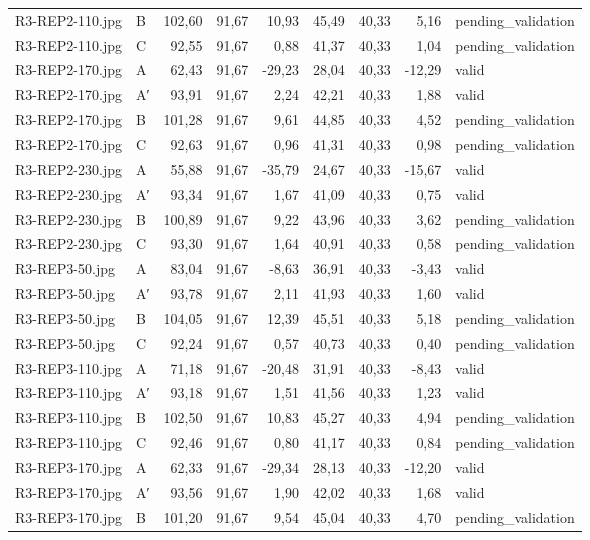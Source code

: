 \begin{scriptsize}
\begin{longtable}{@{}llrrrrrrl@{}}
R3-REP2-110.jpg & B & 102,60 & 91,67 & 10,93 & 45,49 & 40,33 & 5,16 & pending\_validation \\
R3-REP2-110.jpg & C & 92,55 & 91,67 & 0,88 & 41,37 & 40,33 & 1,04 & pending\_validation \\
R3-REP2-170.jpg & A & 62,43 & 91,67 & -29,23 & 28,04 & 40,33 & -12,29 & valid \\
R3-REP2-170.jpg & A′ & 93,91 & 91,67 & 2,24 & 42,21 & 40,33 & 1,88 & valid \\
R3-REP2-170.jpg & B & 101,28 & 91,67 & 9,61 & 44,85 & 40,33 & 4,52 & pending\_validation \\
R3-REP2-170.jpg & C & 92,63 & 91,67 & 0,96 & 41,31 & 40,33 & 0,98 & pending\_validation \\
R3-REP2-230.jpg & A & 55,88 & 91,67 & -35,79 & 24,67 & 40,33 & -15,67 & valid \\
R3-REP2-230.jpg & A′ & 93,34 & 91,67 & 1,67 & 41,09 & 40,33 & 0,75 & valid \\
R3-REP2-230.jpg & B & 100,89 & 91,67 & 9,22 & 43,96 & 40,33 & 3,62 & pending\_validation \\
R3-REP2-230.jpg & C & 93,30 & 91,67 & 1,64 & 40,91 & 40,33 & 0,58 & pending\_validation \\
R3-REP3-50.jpg & A & 83,04 & 91,67 & -8,63 & 36,91 & 40,33 & -3,43 & valid \\
R3-REP3-50.jpg & A′ & 93,78 & 91,67 & 2,11 & 41,93 & 40,33 & 1,60 & valid \\
R3-REP3-50.jpg & B & 104,05 & 91,67 & 12,39 & 45,51 & 40,33 & 5,18 & pending\_validation \\
R3-REP3-50.jpg & C & 92,24 & 91,67 & 0,57 & 40,73 & 40,33 & 0,40 & pending\_validation \\
R3-REP3-110.jpg & A & 71,18 & 91,67 & -20,48 & 31,91 & 40,33 & -8,43 & valid \\
R3-REP3-110.jpg & A′ & 93,18 & 91,67 & 1,51 & 41,56 & 40,33 & 1,23 & valid \\
R3-REP3-110.jpg & B & 102,50 & 91,67 & 10,83 & 45,27 & 40,33 & 4,94 & pending\_validation \\
R3-REP3-110.jpg & C & 92,46 & 91,67 & 0,80 & 41,17 & 40,33 & 0,84 & pending\_validation \\
R3-REP3-170.jpg & A & 62,33 & 91,67 & -29,34 & 28,13 & 40,33 & -12,20 & valid \\
R3-REP3-170.jpg & A′ & 93,56 & 91,67 & 1,90 & 42,02 & 40,33 & 1,68 & valid \\
R3-REP3-170.jpg & B & 101,20 & 91,67 & 9,54 & 45,04 & 40,33 & 4,70 & pending\_validation \\

\end{longtable}
\end{scriptsize}
